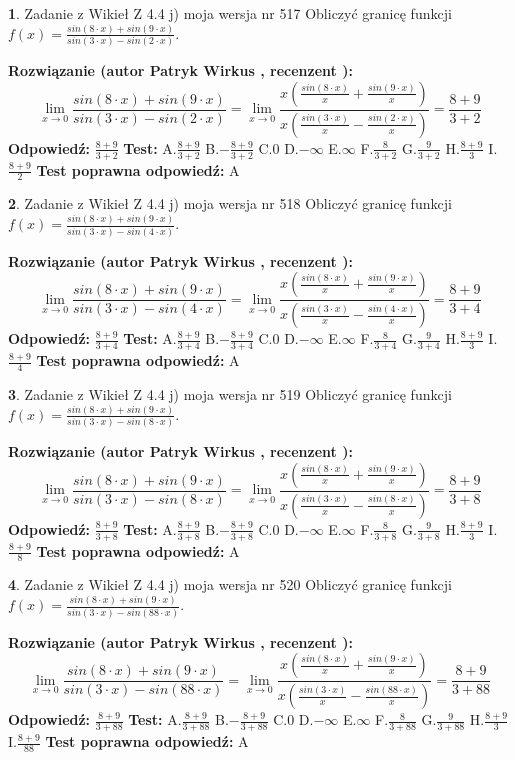 \documentclass[12pt, a4paper]{article}
\theoremstyle{definition} %
\newtheorem{zad}{}
\newcommand{\zadStart}[1]{\begin{zad}#1\newline}
\newcommand{\zadStop}{\end{zad}}
\newcommand{\rozwStart}[2]{\noindent \textbf{Rozwiązanie (autor #1 , recenzent #2): }\newline}
\newcommand{\rozwStop}{\newline}
\newcommand{\odpStart}{\noindent \textbf{Odpowiedź:}\newline}
\newcommand{\odpStop}{\newline}
\newcommand{\testStart}{\noindent \textbf{Test:}\newline}
\newcommand{\testStop}{\newline}
\newcommand{\kluczStart}{\noindent \textbf{Test poprawna odpowiedź:}\newline}
\newcommand{\kluczStop}{\newline}
\begin{document}
\zadStart{Zadanie z Wikieł Z 4.4 j) moja wersja nr 517}
Obliczyć granicę funkcji $f(x)=\frac{sin(8\cdot x) +sin(9\cdot x)}{sin(3\cdot x) -sin(2\cdot x)}$.
\zadStop
\rozwStart{Patryk Wirkus}{}
$$\lim\limits_{x\to 0}\frac{sin(8\cdot x) +sin(9\cdot x)}{sin(3\cdot x) -sin(2\cdot x)}=\lim\limits_{x\to 0}\frac{x(\frac{sin(8\cdot x)}{x}+\frac{sin(9\cdot x)}{x})}{x(\frac{sin(3\cdot x)}{x}-\frac{sin(2\cdot x)}{x})}=\frac{8+9}{3+2}$$
\rozwStop
\odpStart
$\frac{8+9}{3+2}$
\odpStop
\testStart
A.$\frac{8+9}{3+2}$
B.$-\frac{8+9}{3+2}$
C.$0$
D.$-\infty$
E.$\infty$
F.$\frac{8}{3+2}$
G.$\frac{9}{3+2}$
H.$\frac{8+9}{3}$
I.$\frac{8+9}{2}$
\testStop
\kluczStart
A
\kluczStop



\zadStart{Zadanie z Wikieł Z 4.4 j) moja wersja nr 518}
Obliczyć granicę funkcji $f(x)=\frac{sin(8\cdot x) +sin(9\cdot x)}{sin(3\cdot x) -sin(4\cdot x)}$.
\zadStop
\rozwStart{Patryk Wirkus}{}
$$\lim\limits_{x\to 0}\frac{sin(8\cdot x) +sin(9\cdot x)}{sin(3\cdot x) -sin(4\cdot x)}=\lim\limits_{x\to 0}\frac{x(\frac{sin(8\cdot x)}{x}+\frac{sin(9\cdot x)}{x})}{x(\frac{sin(3\cdot x)}{x}-\frac{sin(4\cdot x)}{x})}=\frac{8+9}{3+4}$$
\rozwStop
\odpStart
$\frac{8+9}{3+4}$
\odpStop
\testStart
A.$\frac{8+9}{3+4}$
B.$-\frac{8+9}{3+4}$
C.$0$
D.$-\infty$
E.$\infty$
F.$\frac{8}{3+4}$
G.$\frac{9}{3+4}$
H.$\frac{8+9}{3}$
I.$\frac{8+9}{4}$
\testStop
\kluczStart
A
\kluczStop



\zadStart{Zadanie z Wikieł Z 4.4 j) moja wersja nr 519}
Obliczyć granicę funkcji $f(x)=\frac{sin(8\cdot x) +sin(9\cdot x)}{sin(3\cdot x) -sin(8\cdot x)}$.
\zadStop
\rozwStart{Patryk Wirkus}{}
$$\lim\limits_{x\to 0}\frac{sin(8\cdot x) +sin(9\cdot x)}{sin(3\cdot x) -sin(8\cdot x)}=\lim\limits_{x\to 0}\frac{x(\frac{sin(8\cdot x)}{x}+\frac{sin(9\cdot x)}{x})}{x(\frac{sin(3\cdot x)}{x}-\frac{sin(8\cdot x)}{x})}=\frac{8+9}{3+8}$$
\rozwStop
\odpStart
$\frac{8+9}{3+8}$
\odpStop
\testStart
A.$\frac{8+9}{3+8}$
B.$-\frac{8+9}{3+8}$
C.$0$
D.$-\infty$
E.$\infty$
F.$\frac{8}{3+8}$
G.$\frac{9}{3+8}$
H.$\frac{8+9}{3}$
I.$\frac{8+9}{8}$
\testStop
\kluczStart
A
\kluczStop



\zadStart{Zadanie z Wikieł Z 4.4 j) moja wersja nr 520}
Obliczyć granicę funkcji $f(x)=\frac{sin(8\cdot x) +sin(9\cdot x)}{sin(3\cdot x) -sin(88\cdot x)}$.
\zadStop
\rozwStart{Patryk Wirkus}{}
$$\lim\limits_{x\to 0}\frac{sin(8\cdot x) +sin(9\cdot x)}{sin(3\cdot x) -sin(88\cdot x)}=\lim\limits_{x\to 0}\frac{x(\frac{sin(8\cdot x)}{x}+\frac{sin(9\cdot x)}{x})}{x(\frac{sin(3\cdot x)}{x}-\frac{sin(88\cdot x)}{x})}=\frac{8+9}{3+88}$$
\rozwStop
\odpStart
$\frac{8+9}{3+88}$
\odpStop
\testStart
A.$\frac{8+9}{3+88}$
B.$-\frac{8+9}{3+88}$
C.$0$
D.$-\infty$
E.$\infty$
F.$\frac{8}{3+88}$
G.$\frac{9}{3+88}$
H.$\frac{8+9}{3}$
I.$\frac{8+9}{88}$
\testStop
\kluczStart
A
\kluczStop
\end{document}
